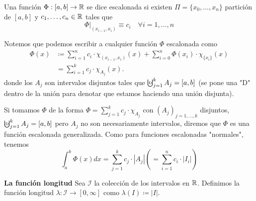	\begin{definition}
		Una función $\Phi : [a,b] \to \mathbb{R}$ se dice escalonada si existen $\Pi = \{ x_0,\dots,x_n \}$ partición de $[a,b]$ y $c_1,\dots,c_n \in \mathbb{R}$ tales que
		\[
		\Phi |_{(x_{i-1},x_i)} \equiv c_i \quad \forall i = 1,\dots,n
		\]
	\end{definition}
	\bigskip
	Notemos que podemos escribir a cualquier función $\Phi$ escalonada como
	\begin{align*}
		\Phi (x) & \coloneq \sum_{i=1}^{n} c_i \cdot \chi_{(x_{i-1},x_i)}(x) + \sum_{i=0}^{n} \Phi(x_i) \cdot \chi_{\{x_i\}}(x) \\
		& = \sum_{i=1}^{k} c_j \cdot \chi_{A_j}(x)
	.\end{align*}
	\noindent donde los $A_j$ son intervalos disjuntos tales que $\textbigcupd_{j=1}^{k} A_j = [a,b]$ (se pone una "D" dentro de la unión para denotar que estamos haciendo una unión disjunta). \par
	\medskip
	Si tomamos $\Phi$ de la forma $\Phi = \sum_{j=1}^{k} c_j \cdot \chi_{A_j}$ con $(A_j)_{j=1,\dots,k}$ disjuntos, $\textbigcupd_{j=1}^{k} A_j = [a,b]$ pero $A_j$  no son necesariamente intervalos, diremos que $\Phi$ es una función escalonada generalizada. Como para funciones escalonadas "normales", tenemos
	\[
	\int_{a}^{b} \Phi (x) dx = \sum_{j=1}^{k} c_j \cdot |A_j| \left( = \sum_{i=1}^{n} c_i \cdot |I_i| \right)
	\]

	\noindent \textbf{La función longitud}
	Sea $\mathcal{I}$ la colección de los intervalos en $\mathbb{R}$. Definimos la función longitud $\lambda : \mathcal{I} \to [0,\infty]$ como $\lambda (I) \coloneq |I|$.
	
